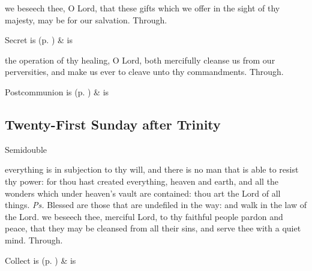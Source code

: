 
\secret
{} we beseech thee, O Lord, that these gifts which we offer in the sight of thy majesty, may be for our salvation. Through.


\begin{rubric}
     Secret is  (p. \pageref{SPSaints}) \&  is 
\end{rubric}

\postcommunion
{} the operation of thy healing, O Lord, both mercifully cleanse us from our perversities, and make us ever to cleave unto thy commandments. Through.
\begin{rubric}
     Postcommunion is  (p. \pageref{SPSaints}) \&  is 
\end{rubric}


\clearpage
\subsection{Twenty-First Sunday after Trinity}\label{trinity}
\begin{inhead}
{Semidouble}
\end{inhead}


\introit
{} everything is in subjection to thy will, and there is no man that is able to resist thy power: for thou hast created everything, heaven and earth, and all the wonders which under heaven's vault are contained: thou art the Lord of all things. \textit{Ps.} Blessed are those that are undefiled in the way: and walk in the law of the Lord.
\collect
{} we beseech thee, merciful Lord, to thy faithful people pardon and peace, that they may be cleansed from all their sins, and serve thee with a quiet mind. Through.
\begin{rubric}
     Collect is  (p. \pageref{SPSaints}) \&  is 
\end{rubric}

